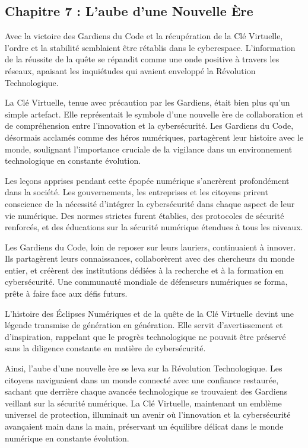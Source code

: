\documentclass{./StyCls/MyArticle}
\begin{document}
\subsection{Chapitre 7 : L'aube d'une Nouvelle Ère}

Avec la victoire des Gardiens du Code et la récupération de la Clé Virtuelle, l'ordre et la stabilité semblaient être rétablis dans le cyberespace. L'information de la réussite de la quête se répandit comme une onde positive à travers les réseaux, apaisant les inquiétudes qui avaient enveloppé la Révolution Technologique.

La Clé Virtuelle, tenue avec précaution par les Gardiens, était bien plus qu'un simple artefact. Elle représentait le symbole d'une nouvelle ère de collaboration et de compréhension entre l'innovation et la cybersécurité. Les Gardiens du Code, désormais acclamés comme des héros numériques, partagèrent leur histoire avec le monde, soulignant l'importance cruciale de la vigilance dans un environnement technologique en constante évolution.

Les leçons apprises pendant cette épopée numérique s'ancrèrent profondément dans la société. Les gouvernements, les entreprises et les citoyens prirent conscience de la nécessité d'intégrer la cybersécurité dans chaque aspect de leur vie numérique. Des normes strictes furent établies, des protocoles de sécurité renforcés, et des éducations sur la sécurité numérique étendues à tous les niveaux.

Les Gardiens du Code, loin de reposer sur leurs lauriers, continuaient à innover. Ils partagèrent leurs connaissances, collaborèrent avec des chercheurs du monde entier, et créèrent des institutions dédiées à la recherche et à la formation en cybersécurité. Une communauté mondiale de défenseurs numériques se forma, prête à faire face aux défis futurs.

L'histoire des Éclipses Numériques et de la quête de la Clé Virtuelle devint une légende transmise de génération en génération. Elle servit d'avertissement et d'inspiration, rappelant que le progrès technologique ne pouvait être préservé sans la diligence constante en matière de cybersécurité.

Ainsi, l'aube d'une nouvelle ère se leva sur la Révolution Technologique. Les citoyens naviguaient dans un monde connecté avec une confiance restaurée, sachant que derrière chaque avancée technologique se trouvaient des Gardiens veillant sur la sécurité numérique. La Clé Virtuelle, maintenant un emblème universel de protection, illuminait un avenir où l'innovation et la cybersécurité avançaient main dans la main, préservant un équilibre délicat dans le monde numérique en constante évolution.
\end{document}
